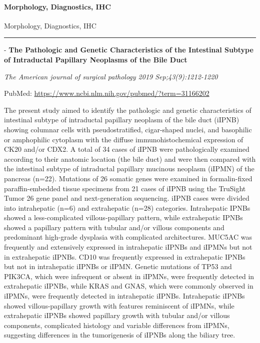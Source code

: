 \documentclass[]{article}
\let\oldparagraph\paragraph
\renewcommand{\paragraph}[1]{\oldparagraph{#1}\mbox{}}
\begin{document}
\hypertarget{morphology-diagnostics-ihc-1}{%
\paragraph{Morphology, Diagnostics,
IHC}\label{morphology-diagnostics-ihc-1}}

Morphology, Diagnostics, IHC

\begin{center}\rule{0.5\linewidth}{\linethickness}\end{center}

 - \textbf{The Pathologic and Genetic Characteristics of the Intestinal
Subtype of Intraductal Papillary Neoplasms of the Bile Duct}

\emph{The American journal of surgical pathology 2019
Sep;43(9):1212-1220}

PubMed: \url{https://www.ncbi.nlm.nih.gov/pubmed/?term=31166202}

The present study aimed to identify the pathologic and genetic
characteristics of intestinal subtype of intraductal papillary neoplasm
of the bile duct (iIPNB) showing columnar cells with pseudostratified,
cigar-shaped nuclei, and basophilic or amphophilic cytoplasm with the
diffuse immunohistochemical expression of CK20 and/or CDX2. A total of
34 cases of iIPNB were pathologically examined according to their
anatomic location (the bile duct) and were then compared with the
intestinal subtype of intraductal papillary mucinous neoplasm (iIPMN) of
the pancreas (n=22). Mutations of 26 somatic genes were examined in
formalin-fixed paraffin-embedded tissue specimens from 21 cases of iIPNB
using the TruSight Tumor 26 gene panel and next-generation sequencing.
iIPNB cases were divided into intrahepatic (n=6) and extrahepatic (n=28)
categories. Intrahepatic IPNBs showed a less-complicated
villous-papillary pattern, while extrahepatic IPNBs showed a papillary
pattern with tubular and/or villous components and predominant
high-grade dysplasia with complicated architectures. MUC5AC was
frequently and extensively expressed in intrahepatic iIPNBs and iIPMNs
but not in extrahepatic iIPNBs. CD10 was frequently expressed in
extrahepatic IPNBs but not in intrahepatic iIPNBs or iIPMN. Genetic
mutations of TP53 and PIK3CA, which were infrequent or absent in iIPMNs,
were frequently detected in extrahepatic iIPNBs, while KRAS and GNAS,
which were commonly observed in iIPMNs, were frequently detected in
intrahepatic iIPNBs. Intrahepatic iIPNBs showed villous-papillary growth
with features reminiscent of iIPMNs, while extrahepatic iIPNBs showed
papillary growth with tubular and/or villous components, complicated
histology and variable differences from iIPMNs, suggesting differences
in the tumorigenesis of iIPNBs along the biliary tree.
\end{document}
